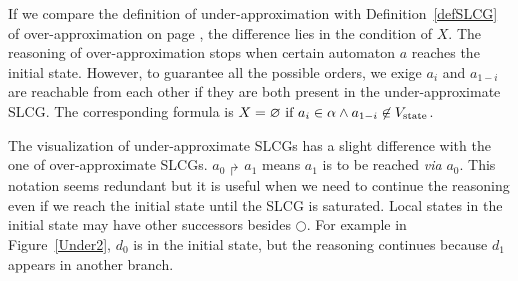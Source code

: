 If we compare the definition of under-approximation with Definition~\ref{defSLCG} of over-approximation on page \pageref{defSLCG}, the difference lies in the condition of $X$. 
The reasoning of over-approximation stops when certain automaton $a$ reaches the initial state. 
However, to guarantee all the possible orders, we exige $a_i$ and $a_{1-i}$ are reachable from each other if they are both present in the under-approximate SLCG.
The corresponding formula is $X= \varnothing \text{ \rm if } a_i\in \alpha\land a_{1-i}\not\in V_{\mathrm{state}}$.

The visualization of under-approximate SLCGs has a slight difference with the one of over-approximate SLCGs.
$a_0\Rsh a_1$ means $a_1$ is to be reached \textit{via} $a_0$.
This notation seems redundant but it is useful when we need to continue the reasoning even if we reach the initial state until the SLCG is saturated.
Local states in the initial state may have other successors besides $\bigcirc$.
For example in Figure~\ref{Under2}, $d_0$ is in the initial state, but the reasoning continues because $d_1$ appears in another branch.

